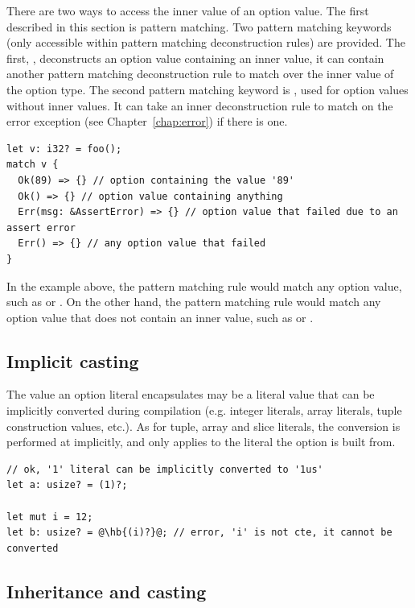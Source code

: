 There are two ways to access the inner value of an option value. The first
described in this section is pattern matching. Two pattern matching keywords
(only accessible within pattern matching deconstruction rules) are provided. The
first, , deconstructs an option value containing an inner
value, it can contain another pattern matching deconstruction rule to match over
the inner value of the option type. The second pattern matching keyword is
, used for option values without inner values. It can take an inner
deconstruction rule to match on the error exception (see
Chapter~\ref{chap:error}) if there is one.

\begin{lstlisting}[style=coloredverbatimError]
let v: i32? = foo();
match v {
  Ok(89) => {} // option containing the value '89'
  Ok() => {} // option value containing anything
  Err(msg: &AssertError) => {} // option value that failed due to an assert error
  Err() => {} // any option value that failed
}
\end{lstlisting}

In the example above, the  pattern matching rule would match any
option value, such as  or . On the other hand, the
 pattern matching rule would match any option value that does not
contain an inner value, such as  or .


\subsection{Implicit casting}

The value an option literal encapsulates may be a literal value that can be
implicitly converted during compilation (e.g. integer literals, array literals,
tuple construction values, etc.). As for tuple, array and slice literals, the
conversion is performed at  implicitly, and only applies to the
literal the option is built from.

\begin{lstlisting}[style=coloredverbatimError, escapechar=@]
// ok, '1' literal can be implicitly converted to '1us'
let a: usize? = (1)?;

let mut i = 12;
let b: usize? = @\hb{(i)?}@; // error, 'i' is not cte, it cannot be converted
\end{lstlisting}

\subsection{Inheritance and casting}

